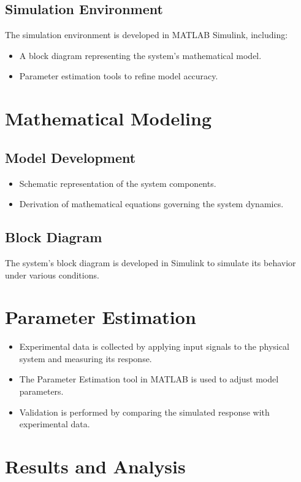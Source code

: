 \documentclass[conference]{IEEEtran}
\begin{document}
\subsection{Simulation Environment}
The simulation environment is developed in MATLAB Simulink, including:
\begin{itemize}
    \item A block diagram representing the system's mathematical model.
    \item Parameter estimation tools to refine model accuracy.
\end{itemize}

\section{Mathematical Modeling}
\subsection{Model Development}
\begin{itemize}
    \item Schematic representation of the system components.
    \item Derivation of mathematical equations governing the system dynamics.
\end{itemize}

\subsection{Block Diagram}
The system's block diagram is developed in Simulink to simulate its behavior under various conditions.

\section{Parameter Estimation}
\begin{itemize}
    \item Experimental data is collected by applying input signals to the physical system and measuring its response.
    \item The Parameter Estimation tool in MATLAB is used to adjust model parameters.
    \item Validation is performed by comparing the simulated response with experimental data.
\end{itemize}

\section{Results and Analysis}
\end{document}
